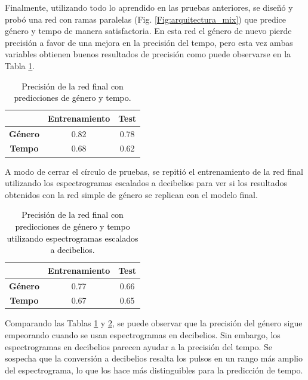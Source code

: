 Finalmente, utilizando todo lo aprendido en las pruebas anteriores, se diseñó y probó una red con ramas paralelas (Fig. \ref{Fig:arquitectura_mix}) que predice género y tempo de manera satisfactoria. En esta red el género de nuevo pierde precisión a favor de una mejora en la precisión del tempo, pero esta vez ambas variables obtienen buenos resultados de precisión como puede observarse en la Tabla \ref{tab:precision_mix_paralela}.

\begin{table}[htb]
\centering
\begin{tabular}{ccc}
\textbf{}       & \textbf{Entrenamiento} & \textbf{Test} \\ \hline
\textbf{Género} & 0.82                   & 0.78          \\
\textbf{Tempo}  & 0.68                   & 0.62         \\ \hline
\end{tabular}
\caption{\textcolor{black}{Precisión de la red final con predicciones de género y tempo.}}
\label{tab:precision_mix_paralela}
\end{table}

A modo de cerrar el círculo de pruebas, se repitió el entrenamiento de la red final utilizando los espectrogramas escalados a decibelios para ver si los resultados obtenidos con la red simple de género se replican con el modelo final. 

\begin{table}[htb]
\centering
\begin{tabular}{ccc}
\textbf{}       & \textbf{Entrenamiento} & \textbf{Test} \\ \hline
\textbf{Género} & 0.77                   & 0.66          \\
\textbf{Tempo}  & 0.67                   & 0.65         \\ \hline
\end{tabular}
\caption{\textcolor{black}{Precisión de la red final con predicciones de género y tempo utilizando espectrogramas escalados a decibelios.}}
\label{tab:precision_mix_paralela_db}
\end{table}

Comparando las Tablas \ref{tab:precision_mix_paralela} y \ref{tab:precision_mix_paralela_db}, se puede observar que la precisión del género sigue empeorando cuando se usan espectrogramas en decibelios. Sin embargo, los espectrogramas en decibelios parecen ayudar a la precisión del tempo. Se sospecha que la conversión a decibelios resalta los pulsos en un rango más amplio del espectrograma, lo que los hace más distinguibles para la predicción de tempo.

